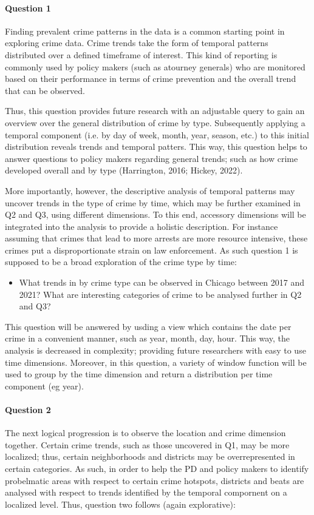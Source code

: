 \documentclass[a4paper]{article}
\begin{document}
\paragraph{Question 1} Finding prevalent crime patterns in the data is a common starting point in exploring crime data. Crime trends take the form of temporal patterns distributed over a defined timeframe of interest. This kind of reporting is commonly used by policy makers (such as atourney generals) who are monitored based on their performance in terms of crime prevention and the overall trend that can be observed. 

Thus, this question provides future research with an adjustable query to gain an overview over the general distribution of crime by type. Subsequently applying a temporal component (i.e. by day of week, month, year, season, etc.) to this initial distribution reveals trends and temporal patters. This way, this question helps to answer questions to policy makers regarding general trends; such as how crime developed overall and by type (Harrington, 2016; Hickey, 2022). 

More importantly, however, the descriptive analysis of temporal patterns may uncover trends in the type of crime by time, which may be further examined in Q2 and Q3, using different dimensions. To this end, accessory dimensions will be integrated into the analysis to provide a holistic description. For instance assuming that crimes that lead to more arrests are more resource intensive, these crimes put a disproportionate strain on law enforcement. As such question 1 is supposed to be a broad exploration of the crime type by time:

\begin{itemize}
	\item What trends in by crime type can be observed in Chicago between 2017 and 2021? What are interesting categories of crime to be analysed further in Q2 and Q3?
\end{itemize}

This question will be answered by usding a view which contains the date per crime in a convenient manner, such as year, month, day, hour. This way, the analysis is decreased in complexity; providing future researchers with easy to use time dimensions. Moreover, in this question, a variety of window function will be used to group by the time dimension and return a distribution per time component (eg year). 

\paragraph{Question 2} The next logical progression is to observe the location and crime dimension together. Certain crime trends, such as those uncovered in Q1, may be more localized; thus, certain neighborhoods and districts may be overrepresented in certain categories. As such, in order to help the PD and policy makers to identify probelmatic areas with respect to certain crime hotspots, districts and beats are analysed with respect to trends identified by the temporal compornent on a localized level. Thus, question two follows (again explorative):
\end{document}
